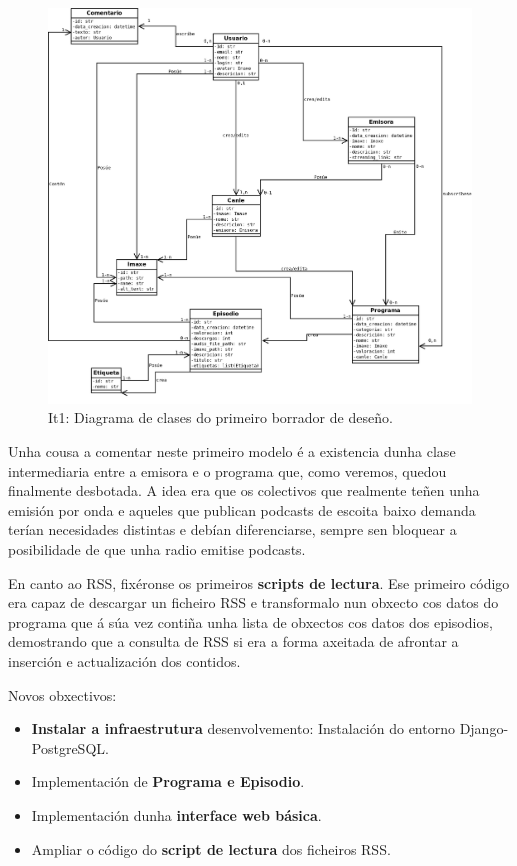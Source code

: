 \begin{figure}[h]
	\centering
	\includegraphics[scale=0.35,keepaspectratio=true]{./images/class_diagram_20171107.png}
	\caption{It1: Diagrama de clases do primeiro borrador de deseño.}
	\label{fig:classold}
\end{figure}

Unha cousa a comentar neste primeiro modelo é a existencia dunha clase \textbf{} intermediaria entre a emisora e o programa que, como veremos, quedou finalmente desbotada. A idea era que os colectivos que realmente teñen unha emisión por onda e aqueles que publican podcasts de escoita baixo demanda terían necesidades distintas e debían diferenciarse, sempre sen bloquear a posibilidade de que unha radio emitise podcasts.

En canto ao RSS, fixéronse os primeiros \textbf{scripts de lectura}. Ese primeiro código era capaz de descargar un ficheiro RSS e transformalo nun obxecto cos datos do programa que á súa vez contiña unha lista de obxectos cos datos dos episodios, demostrando que a consulta de RSS si era a forma axeitada de afrontar a inserción e actualización dos contidos.

Novos obxectivos:

\begin{itemize}
	\item \textbf{Instalar a infraestrutura} desenvolvemento: Instalación do entorno Django-PostgreSQL.
	\item Implementación de \textbf{Programa e Episodio}.
	\item Implementación dunha \textbf{interface web básica}.
	\item Ampliar o código do \textbf{script de lectura} dos ficheiros RSS.
\end{itemize}

